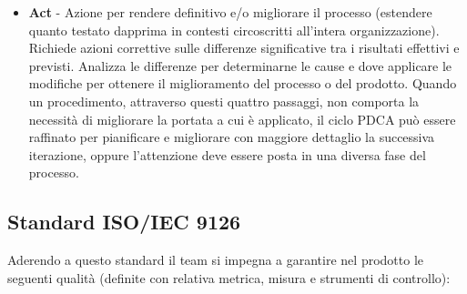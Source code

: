 {\begin{itemize}
  \item  \textbf{Act} - Azione per rendere definitivo e/o migliorare
    il processo (estendere quanto testato dapprima in contesti
    circoscritti all'intera organizzazione). Richiede azioni
    correttive sulle differenze significative tra i risultati
    effettivi e previsti. Analizza le differenze per determinarne le
    cause e dove applicare le modifiche per ottenere il miglioramento
    del processo o del prodotto. Quando un procedimento, attraverso
    questi quattro passaggi, non comporta la necessità di migliorare
    la portata a cui è applicato, il ciclo PDCA può essere raffinato
    per pianificare e migliorare con maggiore dettaglio la successiva
    iterazione, oppure l'attenzione deve essere posta in una diversa
    fase del processo. 

  \end{itemize}





















  \subsection{Standard ISO/IEC 9126}

  Aderendo a questo standard il team si impegna a garantire nel prodotto
  le seguenti qualità (definite con relativa metrica, misura e
  strumenti di controllo): \\


}

